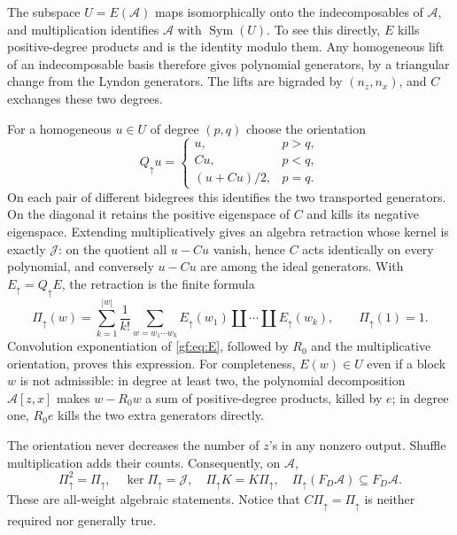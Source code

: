 \documentclass[11pt,a4paper]{article}
\numberwithin{equation}{section}
\theoremstyle{definition}
\theoremstyle{remark}
\providecommand{\shuffle}{\mathbin{\amalg}}
\begin{document}
The subspace $U=E(\mathcal A)$ maps isomorphically onto the
indecomposables of $\mathcal A$, and multiplication identifies
$\mathcal A$ with $\operatorname{Sym}(U)$. To see this directly, $E$ kills
positive-degree products and is the identity modulo them. Any homogeneous
lift of an indecomposable basis therefore gives polynomial generators,
by a triangular change from the Lyndon generators. The lifts are bigraded
by $(n_z,n_x)$, and $C$ exchanges these two degrees.

For a homogeneous $u\in U$ of degree $(p,q)$ choose the orientation
\[
 Q_{\uparrow}u=
 \begin{cases}
 u,&p>q,\\
 Cu,&p<q,\\
 (u+Cu)/2,&p=q.
 \end{cases}
\]
On each pair of different bidegrees this identifies the two transported
generators. On the diagonal it retains the positive eigenspace of $C$ and
kills its negative eigenspace. Extending multiplicatively gives an
algebra retraction whose kernel is exactly $\mathcal J$: on the quotient
all $u-Cu$ vanish, hence $C$ acts identically on every polynomial, and
conversely $u-Cu$ are among the ideal generators. With
$E_{\uparrow}=Q_{\uparrow}E$, the retraction is the finite formula
\begin{equation}
 \Pi_{\uparrow}(w)=\sum_{k=1}^{|w|}\frac1{k!}
       \sum_{w=w_1\cdots w_k}
       E_{\uparrow}(w_1)\shuffle\cdots\shuffle E_{\uparrow}(w_k),
 \qquad \Pi_{\uparrow}(1)=1.
 \label{gf:eq:Pi}
\end{equation}
Convolution exponentiation of \eqref{gf:eq:E}, followed by $R_0$ and
the multiplicative orientation, proves this expression. For completeness,
$E(w)\in U$ even if a block $w$ is not admissible: in degree at least two,
the polynomial decomposition $\mathcal A[z,x]$ makes $w-R_0w$ a sum of
positive-degree products, killed by $e$; in degree one, $R_0e$ kills the
two extra generators directly.

The orientation never decreases the number of $z$'s in any nonzero
output. Shuffle multiplication adds their counts. Consequently, on
$\mathcal A$,
\begin{equation}
 \Pi_{\uparrow}^2=\Pi_{\uparrow},\quad
 \ker\Pi_{\uparrow}=\mathcal J,\quad
 \Pi_{\uparrow}K=K\Pi_{\uparrow},\quad
 \Pi_{\uparrow}(F_D\mathcal A)\subseteq F_D\mathcal A.
 \label{gf:eq:projector-properties}
\end{equation}
These are all-weight algebraic statements. Notice that
$C\Pi_{\uparrow}=\Pi_{\uparrow}$ is neither required nor generally true.
\end{document}
